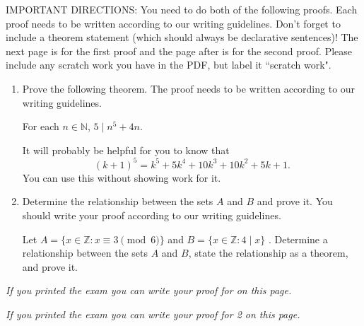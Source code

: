 \documentclass[11pt,answers]{exam}
\newcommand{\Z}{\mathbb{Z}}
\newcommand{\N}{\mathbb{N}}
\begin{document}
IMPORTANT DIRECTIONS: You need to do both of the following proofs. Each proof needs to be written according to our writing guidelines.  Don't forget to include a theorem statement (which should always be declarative sentences)! The next page is for the first proof and the page after is for the second proof. Please include any scratch work you have in the PDF, but label it ``scratch work".

\begin{enumerate}
\item Prove the following theorem. The proof needs to be written according to our writing guidelines.

\begin{center}
For each $n\in\N$, $5\mid n^5+4n$.
\end{center}
It will probably be helpful for you to know that 
\[(k+1)^5 = k^5+5k^4+10k^3+10k^2+5k+1.\]
You can use this without showing work for it.


\item Determine the relationship between the sets $A$ and $B$ and prove it. You should write your proof according to our writing guidelines.

\begin{center}
Let $A = \{x\in\Z : x\equiv 3 \pmod{6} \}$ and $B = \{ x\in \Z : 4\mid x\}$ . Determine a relationship between the sets $A$ and $B$, state the relationship as a theorem, and prove it.
\end{center}




\end{enumerate}

\newpage

\emph{If you printed the exam you can write your proof for  on this page. }


\newpage

\emph{If you printed the exam you can write your proof for 2 on this page. }
\end{document}
